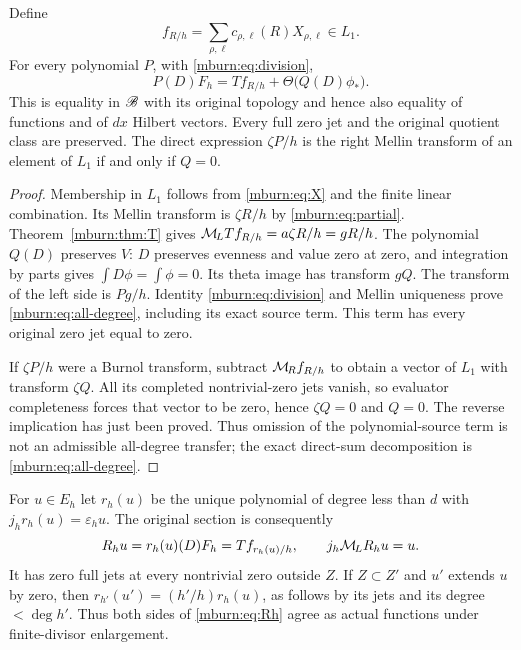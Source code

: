 \documentclass[11pt]{article}
\begin{document}
\begin{mburntheorem}
\label{mburn:thm:all-degree}
Define
\begin{equation}\label{mburn:eq:fR}
 f_{R/h}=\sum_{\rho,\ell}c_{\rho,\ell}(R)X_{\rho,\ell}\in L_1.
\end{equation}
For every polynomial $P$, with \eqref{mburn:eq:division},
\begin{equation}\label{mburn:eq:all-degree}
 \boxed{\quad P(D)F_h=T f_{R/h}+\Theta\bigl(Q(D)\phi_*\bigr).\quad}
\end{equation}
This is equality in $\mathscr B$ with its original topology and hence
also equality of functions and of $dx$ Hilbert vectors. Every
full zero jet and the original quotient class are preserved.
The direct expression $\zeta P/h$ is the right Mellin transform
of an element of $L_1$ if and only if $Q=0$.
\end{mburntheorem}
\begin{proof}
Membership in $L_1$ follows from \eqref{mburn:eq:X} and the finite
linear combination. Its Mellin transform is $\zeta R/h$ by
\eqref{mburn:eq:partial}. Theorem~\ref{mburn:thm:T} gives
$\mathcal M_{\!L} T f_{R/h}=a\zeta R/h=gR/h$. The polynomial $Q(D)$
preserves $V$: $D$ preserves evenness and value zero at zero,
and integration by parts gives $\int D\phi=\int\phi=0$.
Its theta image has transform $gQ$. The transform of the left
side is $Pg/h$. Identity \eqref{mburn:eq:division} and Mellin
uniqueness prove \eqref{mburn:eq:all-degree}, including its exact
source term. This term has every original zero jet equal to zero.

If $\zeta P/h$ were a Burnol transform, subtract
$\mathcal M_{\!R} f_{R/h}$ to obtain a vector of $L_1$ with transform
$\zeta Q$. All its completed nontrivial-zero jets vanish,
so evaluator completeness forces that vector to be zero, hence
$\zeta Q=0$ and $Q=0$. The reverse implication has just been
proved. Thus omission of the polynomial-source term is not
an admissible all-degree transfer; the exact direct-sum
decomposition is \eqref{mburn:eq:all-degree}.
\end{proof}

For $u\in E_h$ let $r_h(u)$ be the unique polynomial of degree
less than $d$ with $j_hr_h(u)=\varepsilon_hu$. The original
section is consequently
\begin{equation}\label{mburn:eq:Rh}
 R_hu=r_h(u)(D)F_h=T f_{r_h(u)/h},\qquad
 j_h\mathcal M_{\!L} R_hu=u.
\end{equation}
It has zero full jets at every nontrivial zero outside $Z$.
If $Z\subset Z'$ and $u'$ extends $u$ by zero, then
$r_{h'}(u')=(h'/h)r_h(u)$, as follows by its jets and its
degree $<\deg h'$. Thus both sides of \eqref{mburn:eq:Rh} agree
as actual functions under finite-divisor enlargement.
\end{document}
